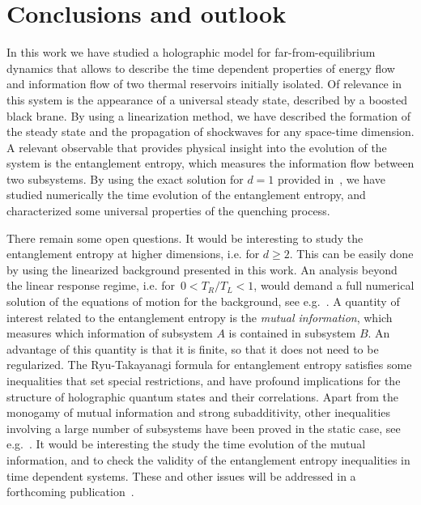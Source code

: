 \documentclass[epj]{webofc}
\begin{document}
\section{Conclusions and outlook}

In this work we have studied a holographic model for far-from-equilibrium dynamics that allows to describe the time dependent properties of energy flow and information flow of two thermal reservoirs initially isolated. Of relevance in this system is the appearance of a universal steady state, described by a boosted black brane. By using a linearization method, we have described the formation of the steady state and the propagation of shockwaves for any space-time dimension. A relevant observable that provides physical insight into the evolution of the system is the entanglement entropy, which measures the information flow between two subsystems. By using the exact solution for $d=1$ provided in~\cite{Bhaseen:2013ypa}, we have studied numerically the time evolution of the entanglement entropy, and characterized some universal properties of the quenching process.


There remain some open questions. It would be interesting to study the entanglement entropy at higher dimensions, i.e. for $d \ge 2$. This can be easily done by using the linearized background presented in this work. An analysis beyond the linear response regime, i.e. for~$0 < T_R/T_L <1$, would demand a full numerical solution of the equations of motion for the background, see e.g.~\cite{AbajoArrastia:2010yt,Chesler:2013lia,Amado:2015uza,Ecker:2015kna,workinprogress}. A quantity of interest related to the entanglement entropy is the {\it mutual information}, which measures which information of subsystem $A$ is contained in subsystem $B$. An advantage of this quantity is that it is finite, so that it does not need to be regularized. The Ryu-Takayanagi formula for entanglement entropy satisfies some inequalities that set special restrictions, and have profound implications for the structure of holographic quantum states and their correlations. Apart from the monogamy of mutual information and strong subadditivity, other inequalities involving a large number of subsystems have been proved in the static case, see e.g.~\cite{Bao:2015bfa}. It would be interesting the study the time evolution of the mutual information, and to check the validity of the entanglement entropy inequalities in time dependent systems. These and other issues will be addressed in a forthcoming publication~\cite{workinprogress}.
\end{document}
